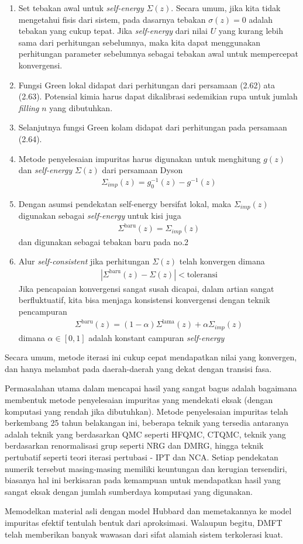 \begin{enumerate}
\item Set tebakan awal untuk \textit{self-energy} $\Sigma(z)$. Secara umum, jika kita tidak mengetahui fisis dari sistem, pada dasarnya tebakan $\sigma(z) = 0$ adalah tebakan yang cukup tepat. Jika \textit{self-energy} dari nilai $U$ yang kurang lebih sama dari perhitungan sebelumnya, maka kita dapat menggunakan  perhitungan parameter sebelumnya sebagai tebakan awal untuk mempercepat konvergensi.
\item Fungsi Green lokal didapat dari perhitungan dari persamaan (2.62) ata (2.63). Potensial kimia harus dapat dikalibrasi sedemikian rupa untuk jumlah \textit{filling} $n$ yang dibutuhkan.
\item Selanjutnya fungsi Green kolam didapat dari perhitungan pada persamaan (2.64).
\item Metode penyelesaian impuritas harus digunakan untuk menghitung $g(z)$ dan \textit{self-energy} $\Sigma(z)$ dari persamaan Dyson
\begin{align}
\Sigma_{imp}(z) = g^{-1}_0(z) - g^{-1}(z)
\end{align}
\item Dengan asumsi pendekatan self-energy bersifat lokal, maka $\Sigma_{imp}(z)$ digunakan sebagai \textit{self-energy} untuk kisi juga
\begin{align}
\Sigma^{\text{baru}}(z) = \Sigma_{imp}(z)
\end{align}
dan digunakan sebagai tebakan baru pada no.2
\item Alur \textit{self-consistent} jika perhitungan $\Sigma(z)$ telah konvergen dimana
\begin{align}
| \Sigma^{\text{baru}}(z) - \Sigma(z) | < \text{toleransi}
\end{align}
Jika pencapaian konvergensi sangat susah dicapai, dalam artian sangat berfluktuatif, kita bisa menjaga konsistensi konvergensi dengan teknik pencampuran
\begin{align}
\Sigma^{\text{baru}}(z) = (1 - \alpha) \Sigma^\text{lama}(z) + \alpha \Sigma_{imp}(z)
\end{align}
dimana $\alpha \in [0,1]$ adalah konstant campuran \textit{self-energy}
\end{enumerate}
Secara umum, metode iterasi ini cukup cepat mendapatkan nilai yang konvergen, dan hanya melambat pada daerah-daerah yang dekat dengan transisi fasa. 

Permasalahan utama dalam mencapai hasil yang sangat bagus adalah bagaimana membentuk metode penyelesaian impuritas yang mendekati eksak (dengan komputasi yang rendah jika dibutuhkan). Metode penyelesaian impuritas telah berkembang 25 tahun belakangan ini, beberapa teknik yang tersedia antaranya adalah teknik yang berdasarkan QMC seperti HFQMC\cite{hfqmc}, CTQMC\cite{ctqmc}, teknik yang berdasarkan renormalisasi grup seperti NRG\cite{nrg} dan DMRG\cite{dmrg}, hingga teknik pertubatif seperti teori iterasi pertubasi - IPT\cite{ipt} dan NCA\cite{nca}. Setiap pendekatan numerik tersebut masing-masing memiliki keuntungan dan kerugian tersendiri, biasanya hal ini berkisaran pada kemampuan untuk mendapatkan hasil yang sangat eksak dengan jumlah sumberdaya komputasi yang digunakan.

Memodelkan material asli dengan model Hubbard dan memetakannya ke model impuritas efektif tentulah bentuk dari aproksimasi. Walaupun begitu, DMFT telah memberikan banyak wawasan dari sifat alamiah sistem terkolerasi kuat.